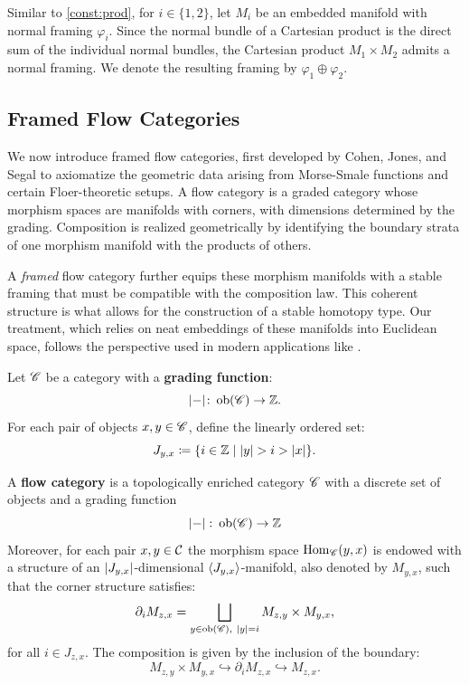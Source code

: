 Similar to \cref{const:prod}, for $i\in\{1,2\}$, let $M_i$ be an embedded manifold with normal framing $\varphi_i$. Since the normal bundle of a Cartesian product is the direct sum of the individual normal bundles, the Cartesian product $M_1\times M_2$ admits a normal framing. We denote the resulting framing by $\varphi_1 \oplus \varphi_2$.

\subsection{Framed Flow Categories}\label{sec:FFCat}
We now introduce framed flow categories, first developed by Cohen, Jones, and Segal \cite{CJS95} to axiomatize the geometric data arising from Morse-Smale functions and certain Floer-theoretic setups. A flow category is a graded category whose morphism spaces are manifolds with corners, with dimensions determined by the grading. Composition is realized geometrically by identifying the boundary strata of one morphism manifold with the products of others. 

A \textit{framed} flow category further equips these morphism manifolds with a stable framing that must be compatible with the composition law. This coherent structure is what allows for the construction of a stable homotopy type. Our treatment, which relies on neat embeddings of these manifolds into Euclidean space, follows the perspective used in modern applications like \cite{LS17}.

\begin{defn}
Let $\mathscr{C}$ be a category with a \textbf{grading function}:
\begin{equation*}
    \lvert - \rvert \colon \operatorname{ob}(\mathscr{C}) \to \mathbb{Z}.
\end{equation*}
For each pair of objects $x, y \in \mathscr{C}$, define the linearly ordered set:
\begin{equation}\label{eq:J_ind_cat}
    J_{y,x} \coloneqq \{ i \in \mathbb{Z} \mid \lvert y \rvert > i > \lvert x \rvert \}.
\end{equation}
\end{defn}

\begin{defn}\label{def:FlowCat}
A \textbf{flow category} is a topologically enriched category $\mathscr{C}$ with a discrete set of objects and a grading function
\begin{equation*}
    \left\lvert-\right\rvert \colon \operatorname{ob}(\mathscr{C}) \to \mathbb{Z}
\end{equation*}
Moreover, for each pair $x,y \in \mathcal{C}$ the morphism space $\operatorname{Hom}_{\mathscr{C}}(y, x)$ is endowed with a structure of an $\left\lvert J_{y,x}\right\rvert$-dimensional $\langle J_{y,x} \rangle$-manifold, also denoted by $M_{y,x}$, such that the corner structure satisfies:
\begin{equation}\label{eq:corner_comp}
    \partial_i M_{z,x} = \bigsqcup_{y \in \operatorname{ob}(\mathscr{C}),\ \left\lvert y\right\rvert = i} M_{z,y} \times M_{y,x},
\end{equation}
for all $i \in J_{z,x}$. The composition is given by the inclusion of the boundary:
\begin{equation*}
    M_{z,y} \times M_{y,x} \hookrightarrow \partial_i M_{z,x} \hookrightarrow M_{z,x}.
\end{equation*}
\end{defn}

